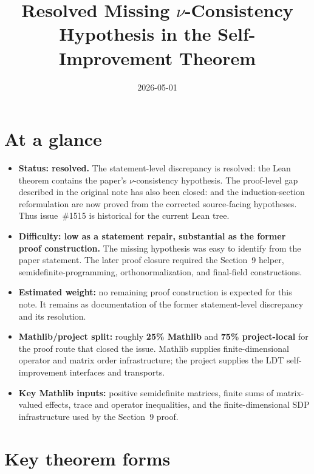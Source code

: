 \documentclass{article}
\title{Resolved Missing $\nu$-Consistency Hypothesis in the Self-Improvement Theorem}
\author{}
\date{2026-05-01}
\begin{document}
\maketitle

\section{At a glance}

\begin{itemize}
  \item \textbf{Status: resolved.}  The statement-level discrepancy is resolved:
  the Lean theorem  contains the paper's
  $\nu$-consistency hypothesis.  The proof-level gap described in the original
  note has also been closed:  and the induction-section
  reformulation are now proved from the corrected source-facing hypotheses.
  Thus issue~\#1515 is historical for the current Lean tree.
  \item \textbf{Difficulty: low as a statement repair, substantial as the
  former proof construction.}  The missing hypothesis was easy to identify from
  the paper statement.  The later proof closure required the Section~9 helper,
  semidefinite-programming, orthonormalization, and final-field constructions.
  \item \textbf{Estimated weight:} no remaining proof construction is expected
  for this note.  It remains as documentation of the former statement-level
  discrepancy and its resolution.
  \item \textbf{Mathlib/project split:} roughly \textbf{25\% Mathlib} and
  \textbf{75\% project-local} for the proof route that closed the issue.
  Mathlib supplies finite-dimensional operator and matrix order infrastructure;
  the project supplies the LDT self-improvement interfaces and transports.
  \item \textbf{Key Mathlib inputs:} positive semidefinite matrices, finite
  sums of matrix-valued effects, trace and operator inequalities, and the
  finite-dimensional SDP infrastructure used by the Section~9 proof.
\end{itemize}

\section{Key theorem forms}
\end{document}

